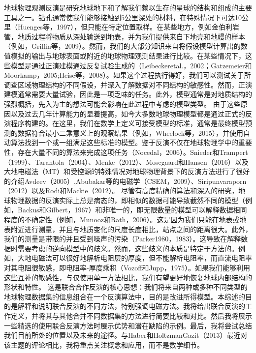 地球物理观测反演是研究地球地下和了解我们赖以生存的星球的结构和组成的主要工具之一。钻孔通常使我们能够接触到5公里深处的材料，在特殊情况下可达10公里（Huenges等，1997），但只能在特定位置取样。在某些地方，例如金伯利岩管，地质过程将物质从深处输送到地表，并为我们提供来自下地壳和地幔的样本（例如，Griffin等，2009）。然而，我们的大部分知识来自将假设模型计算出的数值模拟的输出与地球表面或附近的地球物理观测结果进行比较。在某些情况下，这些模型是通过正演建模通过反复试验生成的（Leibeckeretal.，2002；Gatzemeier和 Moorkamp，2005;Heise等，2008）。如果这个过程执行得好，我们可以测试关于所调查区域物理结构的不同假设，并深入了解数据对不同结构的敏感性。然而，正演建模通常需要大量试验，因此是一项乏味的任务。此外，模型通常是对地质结构的强烈概括，先入为主的想法可能会影响在此过程中考虑的模型类型。
由于这些原因以及过去几年计算能力的显着提高，如今大多数地球物理模型都是通过正式的反演程序构建的。在这里，我们在数学上定义可接受模型的标准，通常是最终模型预测的数据符合最小二乘意义上的观察结果（例如，Wheelock等，2015），并使用自动算法找到一个或一组满足这些标准的模型。鉴于反演不仅在地球物理学中的重要性，存在大量不同的算法来完成这项任务（Nocedal，2006）。Snieder和Trampert（1999）、Tarantola（2004）、Menke（2012）、Mosegaard和Hansen（2016）以及大地电磁法（MT）和受控源的特殊情况对地球物理背景下的反演方法进行了很好的介绍Avdeev（2005）,Abubakar等的电磁学（CSEM，2009）、Siripunvaraporn（2012）以及Rodi和Mackie（2012）。
尽管有高度精确的算法和深入的研究，地球物理数据的反演实际上总是病态的，即相似的数据可能导致截然不同的模型（例如，Backus和Gilbert，1967）和非唯一的，即无限数量的模型可以解释数据相同程度的不确定性（例如，Munooz和Rath，2006）。这是因为我们只能在地表或地表附近进行测量，并且与地质变化的尺度长度相比，站点之间的距离很大。此外，我们的测量是带限的并且受到噪声的污染（Parker1980，1983）。这导致在解释数据时需要考虑的逆向模型中的歧义。然而，这些歧义的本质是特定于方法的。例如，大地电磁法可以很好地解析电阻层的厚度，但不能解析电阻率，而直流电阻率对其电阻很敏感，即电阻率-厚度乘积（Vozoff和Jupp，1975）。如果我们能够利用这些互补的敏感性，与仅使用单一方法相比，我们有望更好地恢复地球内部结构的形状和特性。
这是联合合作反演的核心思想：我们将来自两种或多种不同类型的地球物理数据集的信息组合在一个反演算法中，目的是改进所得模型。本综述的目的是解释和说明联合反演的不同方法，特别强调电磁方法。我将给出联合反演的工作定义，并将其与其他合并不同数据集的方法进行简要比较和对比。然后我将展示一些精选的使用联合反演方法时展示优势和潜在缺陷的示例。最后，我将尝试总结我们目前所处的位置以及未来的途径。与Haber和HoltzmanGazit（2013）最近对该主题的评论相比，我将重点关注概念和应用，而不是数学细节。

